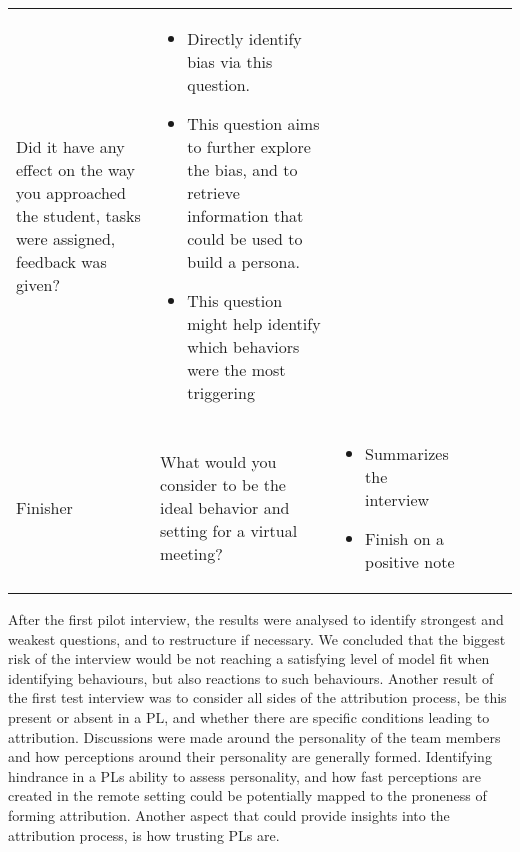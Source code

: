 \begin{table}[htpb]
\begin{tabular}{l p{}  l p{} l p{}}
Did it have any effect on the way you approached the student, tasks were assigned, feedback was given?
	& 
 \begin{minipage}[t]{0.4\textwidth}
    \begin{itemize}
    \item Directly identify bias via this question. 
    \item This question aims to further explore the bias, and to retrieve information that could be used to build a persona.
    \item This question might help identify which behaviors were the most triggering
    \end{itemize}
  \end{minipage}
    \\
     Finisher 
     & What would you consider to be the ideal behavior and setting for a virtual meeting?
      & 
      \begin{minipage}[t]{0.4\textwidth}
    \begin{itemize}
    \item Summarizes the interview
    \item Finish on a positive note
    \end{itemize}
  \end{minipage}  \\
    \bottomrule
  \end{tabular}
\end{table}

After the first pilot interview, the results were analysed to identify strongest and weakest questions, and to restructure if necessary. We concluded that the biggest risk of the interview would be not reaching a satisfying level of model fit when identifying behaviours, but also reactions to such behaviours. Another result of the first test interview was to consider all sides of the attribution process, be this present or absent in a PL, and whether there are specific conditions leading to attribution. Discussions were made around the personality of the team members and how perceptions around their personality are generally formed. Identifying hindrance in a PLs ability to assess personality, and how fast perceptions are created in the remote setting could be potentially mapped to the proneness of forming attribution. Another aspect that could provide insights into the attribution process, is how trusting PLs are.

